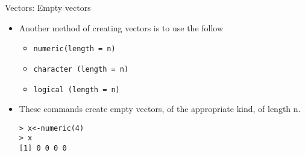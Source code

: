 \documentclass{beamer}
\begin{document}

\begin{frame}[fragile]{Vectors: Empty vectors}

\begin{itemize}
\item Another method of creating vectors is to use the follow

\begin{itemize}
\item \texttt{numeric(length = n)} 
\item \texttt{character (length = n)} 
\item \texttt{logical (length = n)}
\end{itemize}

\item These commands create empty vectors, of the appropriate
kind, of length n.

\begin{framed}
\begin{verbatim}
> x<-numeric(4)
> x
[1] 0 0 0 0
\end{verbatim}
\end{framed}
\end{itemize}
\end{frame}
\end{document}
